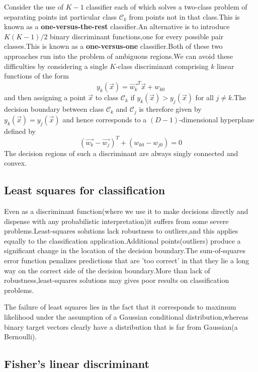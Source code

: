 Consider the use of $K-1$ classifier each of which solves a two-class problem of separating points int particular class $\mathcal{C}_k$ from points not in that class.This is known as a \textbf{one-versus-the-rest} classifier.An alternative is to introduce $K(K-1)/2$ binary discriminant functions,one for every possible pair classes.This is known as a \textbf{one-versus-one} classifier.Both of these two approaches run into the problem of ambiguous regions.We can avoid these difficulties by considering a single $K$-class discriminant comprising $k$ linear functions of the form
\begin{equation}
y_k(\vec{x}) = \vec{w_k}^T\vec{x}+w_{k0}
\end{equation}
and then assigning a point $\vec{x}$ to class $\mathcal{C}_k$ if $y_k(\vec{x}) > y_j(\vec{x})$ for all $j \neq k$.The decision boundary between class $\mathcal{C}_k$ and $\mathcal{C}_j$ is therefore given by $y_k(\vec{x}) = y_j(\vec{x})$ and hence corresponds to a $(D-1)$-dimensional hyperplane defined by
\begin{equation}
(\vec{w_k}-\vec{w_j})^T + (w_{k0}-w_{j0}) = 0
\end{equation}
The decision regions of such a discriminant are always singly connected and convex.

\subsection{Least squares for classification}
Even as a discriminant function(where we use it to make decisions directly and dispense with any probabilistic interpretation)it suffers from some severe problems.Least-squares solutions lack robustness to outliers,and this applies equally to the classification application.Additional points(outliers) produce a significant change in the location of the decision boundary.The sum-of-squares error function penalizes predictions that are 'too correct' in that they lie a long way on the correct side of the decision boundary.More than lack of robustness,least-squares solutions may gives poor results on classification problems.

The failure of least squares lies in the fact that it corresponds to maximum likelihood under the assumption of a Gaussian conditional distribution,whereas binary target vectors clearly have a distribution that is far from Gaussian(a Bernoulli).



\subsection{Fisher's linear discriminant}
